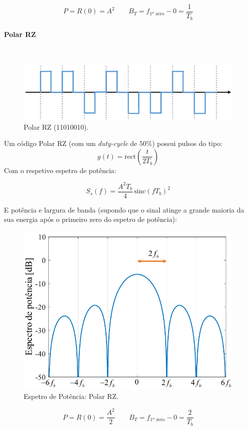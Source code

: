 $$
    \boxed{P = R(0) = A^2}\qquad
    \boxed{B_T = f_{\text{1º zero}} - 0 = \frac{1}{T_b}}
$$
\clearpage
\paragraph*{Polar RZ}\mbox{}\\
\label{line:polarRZ}
\begin{figure}[H]
    \centering
    \includegraphics[width = 0.8\linewidth]{img/digital/line-codes/LPolarRZ.png}
    \caption{Polar RZ (11010010).}
    \label{fig:LPolarRZ}
\end{figure}
\noindent Um código Polar RZ (com um \textit{duty-cycle} de $50\%$) possui pulsos do tipo:
$$
    g(t) = \text{rect}\left(\frac{t}{2T_b}\right)
$$
\noindent Com o respetivo espetro de potência:

$$
    \boxed{S_s(f) = \frac{A^2 T_b}{4}\, \text{sinc}(fT_b)^2}
$$

\noindent E potência e largura de banda (supondo que o sinal atinge a grande maioria da sua energia após o primeiro zero do espetro de potência):

\begin{figure}[H]
    \centering
    \includegraphics[width = 0.7\linewidth]{img/digital/line-codes/PPolarRZ.png}
    \caption{Espetro de Potência: Polar RZ.}
    \label{fig:PPolarRZ}
\end{figure}

$$
    \boxed{P = R(0) = \frac{A^2}{2}}\qquad
    \boxed{B_T = f_{\text{1º zero}} - 0 = \frac{2}{T_b}}
$$

